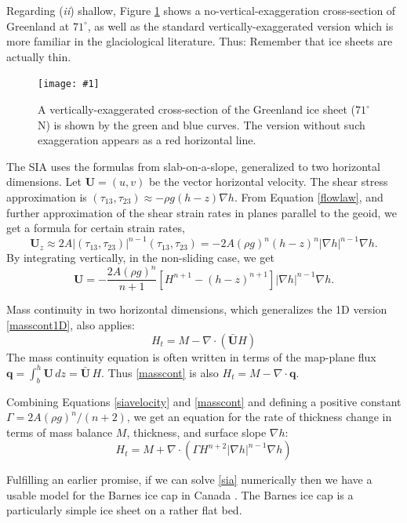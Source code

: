 \documentclass[titlepage,letterpaper,final,12pt]{scrartcl}
\newcommand{\bq}{\mathbf{q}}
\newcommand{\grad}{\nabla}
\newcommand{\Div}{\nabla\cdot}
\newcommand{\onefigsize}[3]{
\begin{figure}[ht]
\centering
\texttt{[image: \#1]}
\caption{#2}
\label{fig:#1}
\end{figure}}
\newcommand{\onefig}[2]{\onefigsize{#1}{#2}{3.0in}}
\begin{document}
Regarding (\emph{ii}) shallow, Figure \ref{fig:green_transect} shows a no-vertical-exaggeration cross-section of Greenland at $71^\circ$, as well as the standard vertically-exaggerated version which is more familiar in the glaciological literature.  Thus: Remember that ice sheets are actually thin.

\onefig{green_transect}{A vertically-exaggerated cross-section of the Greenland ice sheet ($71^\circ$ N) is shown by the green and blue curves.  The version without such exaggeration appears as a red horizontal line.}

The SIA uses the formulas from slab-on-a-slope, generalized to two horizontal dimensions.  Let $\mathbf{U} = (u,v)$ be the vector horizontal velocity.  The shear stress approximation is $(\tau_{13},\tau_{23}) \approx - \rho g (h-z) \nabla h$.  From Equation \eqref{flowlaw}, and further approximation of the shear strain rates in planes parallel to the geoid, we get a formula for certain strain rates,
\begin{equation*}
\mathbf{U}_z \approx 2 A |(\tau_{13},\tau_{23})|^{n-1} (\tau_{13},\tau_{23}) = - 2 A (\rho g)^n (h-z)^n |\nabla h|^{n-1} \nabla h.
\end{equation*}
By integrating vertically, in the non-sliding case, we get
\begin{equation}
\mathbf{U} = - \frac{2 A (\rho g)^n}{n+1} \left[H^{n+1} - (h-z)^{n+1}\right] |\nabla h|^{n-1} \nabla h.  \label{siavelocity}
\end{equation}

Mass continuity in two horizontal dimensions, which generalizes the 1D version \eqref{masscont1D}, also applies:
\begin{equation}
    H_t = M - \Div\left(\bar{\mathbf{U}} H\right)  \label{masscont}
\end{equation}
The mass continuity equation is often written in terms of the map-plane flux $\bq = \int_{b}^{h} \mathbf{U}\,dz = \bar{\mathbf{U}}\,H$.  Thus \eqref{masscont} is also $H_t = M - \Div \bq$.

Combining Equations \eqref{siavelocity} and \eqref{masscont} and defining a positive constant $\Gamma = 2 A (\rho g)^n / (n+2)$, we get an equation for the rate of thickness change in terms of mass balance $M$, thickness, and surface slope $\grad h$:
\begin{equation}
H_t = M + \Div \left(\Gamma H^{n+2} |\grad h|^{n-1} \grad h \right) \label{sia}
\end{equation}

Fulfilling an earlier promise, if we can solve \eqref{sia} numerically then we have a usable model for the Barnes ice cap in Canada \cite{Mahaffy}.  The Barnes ice cap is a particularly simple ice sheet on a rather flat bed.
\end{document}
